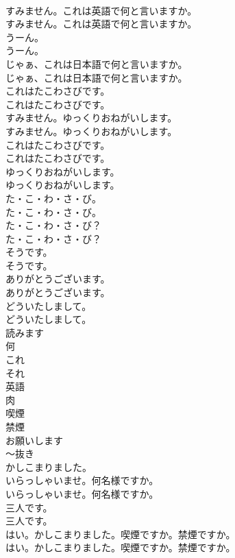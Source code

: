 \documentclass[8pt]{extreport}
\begin{document}
\begin{CJK}{UTF8}{min}
\\	すみません。これは英語で何と言いますか。	
\\	すみません。これは英語で何と言いますか。 
\\	うーん。	
\\	うーん。 
\\	じゃぁ、これは日本語で何と言いますか。	
\\	じゃぁ、これは日本語で何と言いますか。 
\\	これはたこわさびです。	
\\	これはたこわさびです。 
\\	すみません。ゆっくりおねがいします。	
\\	すみません。ゆっくりおねがいします。 
\\	これはたこわさびです。	
\\	これはたこわさびです。 
\\	ゆっくりおねがいします。	
\\	ゆっくりおねがいします。 
\\	た・こ・わ・さ・び。	
\\	た・こ・わ・さ・び。 
\\	た・こ・わ・さ・び？	
\\	た・こ・わ・さ・び？ 
\\	そうです。	
\\	そうです。 
\\	ありがとうございます。	
\\	ありがとうございます。 
\\	どういたしまして。	
\\	どういたしまして。 
\\	読みます
\\	何
\\	これ
\\	それ
\\	英語
\\	肉
\\	喫煙
\\	禁煙
\\	お願いします
\\	～抜き
\\	かしこまりました。
\\	いらっしゃいませ。何名様ですか。	
\\	いらっしゃいませ。何名様ですか。 
\\	三人です。	
\\	三人です。 
\\	はい。かしこまりました。喫煙ですか。禁煙ですか。	
\\	はい。かしこまりました。喫煙ですか。禁煙ですか。 

\end{CJK}
\end{document}
